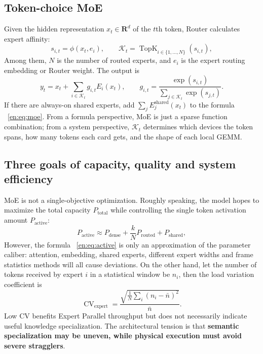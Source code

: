 \documentclass[10pt,a4paper,fontset=none]{ctexart}
\newcommand{\term}[1]{\textbf{#1}}
\begin{document}
\subsection{Token-choice MoE}

Given the hidden representation $x_t\in\mathbf{R}^{d}$ of the $t$th token, Router calculates expert affinity:
\begin{equation}
  s_{i,t}=\phi(x_t,e_i),\qquad
  \mathcal{K}_t=\operatorname{TopK}_{i\in\{1,\ldots,N\}}(s_{i,t}),
  \label{en:eq:router}
\end{equation}
Among them, $N$ is the number of routed experts, and $e_i$ is the expert routing embedding or Router weight. The output is
\begin{equation}
  y_t=x_t+\sum_{i\in\mathcal{K}_t}g_{i,t}E_i(x_t),
  \qquad
  g_{i,t}=\frac{\exp(s_{i,t})}{\sum_{j\in\mathcal{K}_t}\exp(s_{j,t})}.
  \label{en:eq:moe}
\end{equation}
If there are always-on shared experts, add $\sum_j E^{\mathrm{shared}}_j(x_t)$ to the formula ~\eqref{en:eq:moe}. From a formula perspective, MoE is just a sparse function combination; from a system perspective, $\mathcal{K}_t$ determines which devices the token spans, how many tokens each card gets, and the shape of each local GEMM.

\subsection{Three goals of capacity, quality and system efficiency}

MoE is not a single-objective optimization. Roughly speaking, the model hopes to maximize the total capacity $P_{\mathrm{total}}$ while controlling the single token activation amount $P_{\mathrm{active}}$:
\begin{equation}
  P_{\mathrm{active}} \approx P_{\mathrm{dense}}
  +\frac{k}{N}P_{\mathrm{routed}}+P_{\mathrm{shared}},
  \label{en:eq:active}
\end{equation}
However, the formula ~\eqref{en:eq:active} is only an approximation of the parameter caliber: attention, embedding, shared experts, different expert widths and frame statistics methods will all cause deviations. On the other hand, let the number of tokens received by expert $i$ in a statistical window be $n_i$, then the load variation coefficient is
\begin{equation}
  \operatorname{CV}_{\mathrm{expert}}
  =\frac{\sqrt{\frac{1}{N}\sum_i(n_i-\bar n)^2}}{\bar n}.
  \label{en:eq:cv}
\end{equation}
Low CV benefits Expert Parallel throughput but does not necessarily indicate useful knowledge specialization. The architectural tension is that \term{semantic specialization may be uneven, while physical execution must avoid severe stragglers}.
\end{document}
